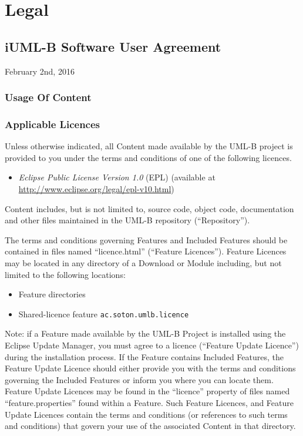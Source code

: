 \section{Legal}
\label{sec:simulator-legal}

\subsection{iUML-B Software User Agreement}
\label{sec:simulator-user-agreement}

February 2nd, 2016

\subsubsection{Usage Of Content}
\label{sec:usage-content}



\subsubsection{Applicable Licences}
\label{sec:simulator-applicable-licences}

Unless otherwise indicated, all Content made available by the UML-B
project is provided to you under the terms and conditions of one of
the following licences.

\begin{itemize}

\item \emph{Eclipse Public License Version 1.0} (EPL) (available at 
   \url{http://www.eclipse.org/legal/epl-v10.html})
\end{itemize}

Content includes, but is not limited to, source code, object code,
documentation and other files maintained in the UML-B repository (``Repository'').

The terms and conditions governing Features and Included Features
should be contained in files named ``licence.html'' (``Feature
Licences'').  Feature Licences may be located in any directory of a
Download or Module including, but not limited to the following
locations:

\begin{itemize}
\item Feature directories

\item Shared-licence feature \texttt{ac.soton.umlb.licence}
\end{itemize}

Note: if a Feature made available by the UML-B Project is
installed using the Eclipse Update Manager, you must agree to a
licence (``Feature Update Licence'') during the installation process.
If the Feature contains Included Features, the Feature Update
Licence should either provide you with the terms and conditions
governing the Included Features or inform you where you can locate
them.  Feature Update Licences may be found in the ``licence''
property of files named ``feature.properties'' found within a
Feature.  Such Feature Licences, and Feature Update
Licences contain the terms and conditions (or references to such
terms and conditions) that govern your use of the associated
Content in that directory.

